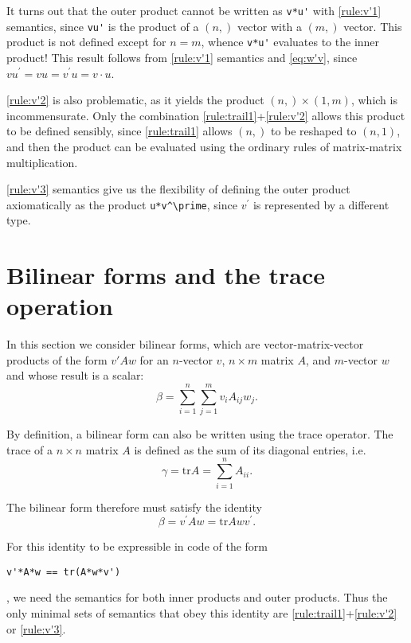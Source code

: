 It turns out that the outer product cannot be written as \lstinline|v*u'| with
\ref{rule:v'1} semantics, since \lstinline|vu'| is the product of a $(n,)$
vector with a $(m,)$ vector. This product is not defined except for $n = m$,
whence \lstinline|v*u'| evaluates to the inner product! This result follows
from \ref{rule:v'1} semantics and \eqref{eq:w'v}, since $vu^\prime = vu =
v^\prime u = v \cdot u$.

\ref{rule:v'2} is also problematic, as it yields the product $(n,) \times (1,
m)$, which is incommensurate. Only the combination
\ref{rule:trail1}+\ref{rule:v'2} allows this product to be defined sensibly,
since \ref{rule:trail1} allows $(n,)$ to be reshaped to $(n,1)$, and then the
product can be evaluated using the ordinary rules of matrix-matrix
multiplication.

\ref{rule:v'3} semantics give us the flexibility of defining the outer product
axiomatically as the product \lstinline|u*v^\prime|, since $v^\prime$ is represented
by a different type.



\section{Bilinear forms and the trace operation}

In this section we consider bilinear forms, which are vector-matrix-vector
products of the form $v'Aw$ for an $n$-vector $v$, $n\times m$ matrix $A$, and
$m$-vector $w$ and whose result is a scalar:
%
\begin{equation}
	\beta = \sum_{i=1}^n \sum_{j=1}^m v_i A_{ij} w_j.\label{eq:v'Aw}
\end{equation}

By definition, a bilinear form can also be written using the trace operator.
The trace of a $n \times n$ matrix $A$ is defined as the sum of its diagonal
entries, i.e.
%
\begin{equation}
	\gamma = \mathrm{tr }A = \sum_{i=1}^n A_{ii}.\label{eq:tr}
\end{equation}

The bilinear form therefore must satisfy the identity
%
\begin{equation}
	\beta = v^\prime Aw = \mathrm{tr }Awv^\prime.\label{eq:trid}
\end{equation}

For this identity to be expressible in code of the form
\begin{lstlisting}
v'*A*w == tr(A*w*v')
\end{lstlisting}
, we need the semantics for both inner products and outer products.
Thus the only minimal sets of semantics that obey this identity are
\ref{rule:trail1}+\ref{rule:v'2} or \ref{rule:v'3}.

